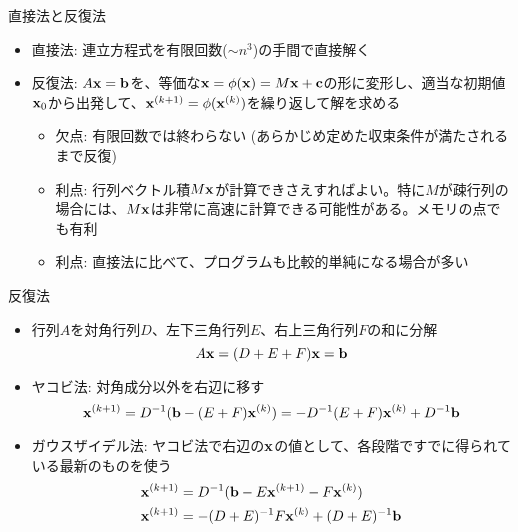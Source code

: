 \documentclass[dvipdfmx]{beamer}
\begin{document}
\begin{frame}[t,fragile]{直接法と反復法}
  \begin{itemize}
    \setlength{\itemsep}{1em}
  \item 直接法: 連立方程式を有限回数($\sim n^3$)の手間で直接解く
  \item 反復法: $A{\bf x}={\bf b}$を、等価な${\bf x} = \phi({\bf x}) = M{\bf x} + {\bf c}$の形に変形し、適当な初期値${\bf x}_0$から出発して、${\bf x}^{(k+1)} = \phi({\bf x}^{(k)})$を繰り返して解を求める
    \begin{itemize}
    \item 欠点: 有限回数では終わらない (あらかじめ定めた収束条件が満たされるまで反復)
    \item 利点: 行列ベクトル積$M{\bf x}$が計算できさえすればよい。特に$M$が疎行列の場合には、$M{\bf x}$は非常に高速に計算できる可能性がある。メモリの点でも有利
    \item 利点: 直接法に比べて、プログラムも比較的単純になる場合が多い
    \end{itemize}
  \end{itemize}
\end{frame}

\begin{frame}[t,fragile]{反復法}
  \begin{itemize}
    \setlength{\itemsep}{1em}
  \item 行列$A$を対角行列$D$、左下三角行列$E$、右上三角行列$F$の和に分解
    \[
    A{\bf x} = (D + E + F){\bf x} = {\bf b}
    \]
  \item ヤコビ法: 対角成分以外を右辺に移す
    \[
      {\bf x}^{(k+1)} = D^{-1} ({\bf b} - (E+F) {\bf x}^{(k)}) = -D^{-1}(E+F){\bf x}^{(k)} + D^{-1} {\bf b}
      \]
    \item ガウスザイデル法: ヤコビ法で右辺の${\bf x}$の値として、各段階ですでに得られている最新のものを使う
    \begin{align*}
      {\bf x}^{(k+1)} &= D^{-1} ({\bf b} - E{\bf x}^{(k+1)} - F{\bf x}^{(k)}) \\
      {\bf x}^{(k+1)} &= -(D+E)^{-1} F{\bf x}^{(k)} + (D+E)^{-1}{\bf b}
    \end{align*}
  \end{itemize}
\end{frame}
\end{document}
